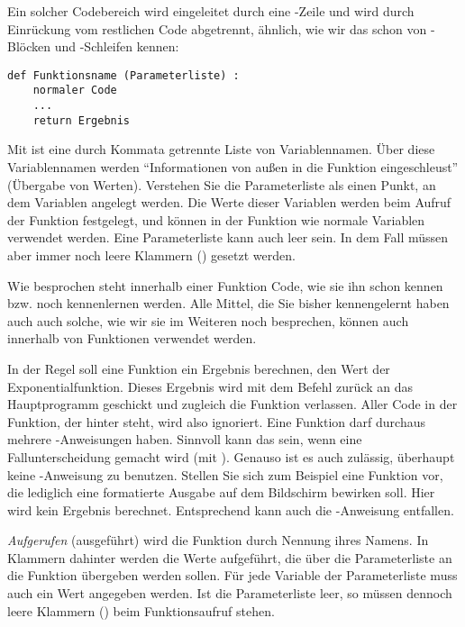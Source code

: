 Ein solcher Codebereich wird eingeleitet durch eine -Zeile und wird durch Einrückung vom restlichen Code abgetrennt, ähnlich, wie wir das schon von -Blöcken und -Schleifen kennen:

\begin{codebox}
\begin{verbatim}
def Funktionsname (Parameterliste) :
    normaler Code
    ...
    return Ergebnis
\end{verbatim}
\end{codebox}

Mit  ist eine durch Kommata getrennte Liste von Variablennamen. Über diese Variablennamen werden \enquote{Informationen von außen in die Funktion eingeschleust} (Übergabe von Werten). Verstehen Sie die Parameterliste als einen Punkt, an dem Variablen angelegt werden. Die Werte dieser Variablen werden beim Aufruf der Funktion festgelegt, und können in der Funktion wie normale Variablen verwendet werden. Eine Parameterliste kann auch leer sein. In dem Fall müssen aber immer noch  leere Klammern () gesetzt werden.

Wie besprochen steht innerhalb einer Funktion Code, wie sie ihn schon kennen bzw. noch kennenlernen werden. Alle Mittel, die Sie bisher kennengelernt haben auch auch solche, wie wir sie im Weiteren noch besprechen, können auch innerhalb von Funktionen verwendet werden.

In der Regel soll eine Funktion ein Ergebnis berechnen, \eg den Wert der Exponentialfunktion. Dieses Ergebnis wird mit dem Befehl  zurück an das Hauptprogramm geschickt und zugleich die Funktion verlassen. Aller Code in der Funktion, der hinter  steht, wird also ignoriert. Eine Funktion darf durchaus mehrere -Anweisungen haben. Sinnvoll kann das sein, wenn eine Fallunterscheidung gemacht wird (\eg mit ). Genauso ist es auch zulässig, überhaupt keine -Anweisung zu benutzen. Stellen Sie sich zum Beispiel eine Funktion vor, die lediglich eine formatierte Ausgabe auf dem Bildschirm bewirken soll. Hier wird kein Ergebnis berechnet. Entsprechend kann auch die -Anweisung entfallen.

\emph{Aufgerufen} (\ie ausgeführt) wird die Funktion durch Nennung ihres Namens. In Klammern dahinter werden die Werte aufgeführt, die über die Parameterliste an die Funktion übergeben werden sollen. Für jede Variable der Parameterliste muss auch ein Wert angegeben werden. Ist die Parameterliste leer, so müssen dennoch leere Klammern () beim Funktionsaufruf stehen.

